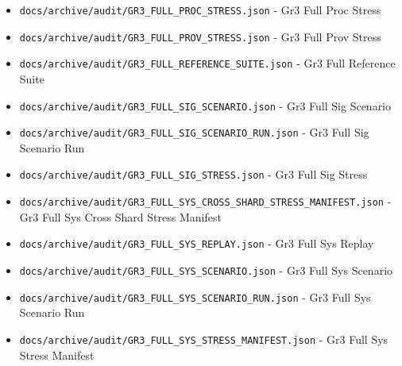 \documentclass[10.5pt,a4paper,openany]{book}
\begin{document}
\begin{itemize}
\item \texttt{docs/\allowbreak{}archive/\allowbreak{}audit/\allowbreak{}GR3\_\allowbreak{}FULL\_\allowbreak{}PROC\_\allowbreak{}STRESS.\allowbreak{}json} -\allowbreak{} Gr3 Full Proc Stress
\item \texttt{docs/\allowbreak{}archive/\allowbreak{}audit/\allowbreak{}GR3\_\allowbreak{}FULL\_\allowbreak{}PROV\_\allowbreak{}STRESS.\allowbreak{}json} -\allowbreak{} Gr3 Full Prov Stress
\item \texttt{docs/\allowbreak{}archive/\allowbreak{}audit/\allowbreak{}GR3\_\allowbreak{}FULL\_\allowbreak{}REFERENCE\_\allowbreak{}SUITE.\allowbreak{}json} -\allowbreak{} Gr3 Full Reference Suite
\item \texttt{docs/\allowbreak{}archive/\allowbreak{}audit/\allowbreak{}GR3\_\allowbreak{}FULL\_\allowbreak{}SIG\_\allowbreak{}SCENARIO.\allowbreak{}json} -\allowbreak{} Gr3 Full Sig Scenario
\item \texttt{docs/\allowbreak{}archive/\allowbreak{}audit/\allowbreak{}GR3\_\allowbreak{}FULL\_\allowbreak{}SIG\_\allowbreak{}SCENARIO\_\allowbreak{}RUN.\allowbreak{}json} -\allowbreak{} Gr3 Full Sig Scenario Run
\item \texttt{docs/\allowbreak{}archive/\allowbreak{}audit/\allowbreak{}GR3\_\allowbreak{}FULL\_\allowbreak{}SIG\_\allowbreak{}STRESS.\allowbreak{}json} -\allowbreak{} Gr3 Full Sig Stress
\item \texttt{docs/\allowbreak{}archive/\allowbreak{}audit/\allowbreak{}GR3\_\allowbreak{}FULL\_\allowbreak{}SYS\_\allowbreak{}CROSS\_\allowbreak{}SHARD\_\allowbreak{}STRESS\_\allowbreak{}MANIFEST.\allowbreak{}json} -\allowbreak{} Gr3 Full Sys Cross Shard Stress Manifest
\item \texttt{docs/\allowbreak{}archive/\allowbreak{}audit/\allowbreak{}GR3\_\allowbreak{}FULL\_\allowbreak{}SYS\_\allowbreak{}REPLAY.\allowbreak{}json} -\allowbreak{} Gr3 Full Sys Replay
\item \texttt{docs/\allowbreak{}archive/\allowbreak{}audit/\allowbreak{}GR3\_\allowbreak{}FULL\_\allowbreak{}SYS\_\allowbreak{}SCENARIO.\allowbreak{}json} -\allowbreak{} Gr3 Full Sys Scenario
\item \texttt{docs/\allowbreak{}archive/\allowbreak{}audit/\allowbreak{}GR3\_\allowbreak{}FULL\_\allowbreak{}SYS\_\allowbreak{}SCENARIO\_\allowbreak{}RUN.\allowbreak{}json} -\allowbreak{} Gr3 Full Sys Scenario Run
\item \texttt{docs/\allowbreak{}archive/\allowbreak{}audit/\allowbreak{}GR3\_\allowbreak{}FULL\_\allowbreak{}SYS\_\allowbreak{}STRESS\_\allowbreak{}MANIFEST.\allowbreak{}json} -\allowbreak{} Gr3 Full Sys Stress Manifest

\end{itemize}
\end{document}
